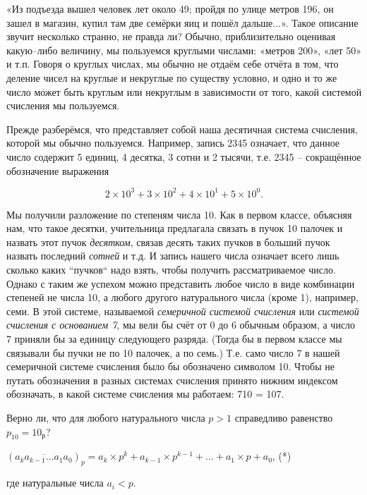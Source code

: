 
«Из подъезда вышел человек лет около 49; пройдя по улице метров 196, он зашел в магазин, купил там две семёрки яиц и пошёл дальше...». Такое описание звучит несколько странно, не правда ли? Обычно, приблизительно оценивая какую--либо величину, мы пользуемся круглыми числами: «метров 200», «лет 50» и т.п. Говоря о круглых числах, мы обычно не отдаём себе отчёта в том, что деление чисел на круглые и некруглые по существу условно, и одно и то же число может быть круглым или некруглым в зависимости от того, какой системой счисления мы пользуемся.

Прежде разберёмся, что представляет собой наша десятичная система счисления, которой мы обычно пользуемся. Например, запись 2345 означает, что данное число содержит 5 единиц, 4 десятка, 3 сотни и 2 тысячи, т.е. 2345 -- сокращённое обозначение выражения

\begin{equation}
    2 \times 10^3 + 3 \times 10^2 + 4 \times 10^1 + 5 \times 10^0.
\end{equation}

Мы получили разложение по степеням числа 10. Как в первом классе, объясняя нам, что такое десятки, учительница предлагала связать в пучок 10 палочек и назвать этот пучок \textit{десятком}, связав десять таких пучков в больший пучок назвать последний \textit{сотней} и т.д. И запись нашего числа означает всего лишь сколько каких “пучков“ надо взять, чтобы получить рассматриваемое число. Однако с таким же успехом можно представить любое число в виде комбинации степеней не числа 10, а любого другого натурального числа (кроме 1), например, семи. В этой системе, называемой \textit{семеричной системой счисления} или \textit{системой счисления с основанием 7}, мы вели бы счёт от 0 до 6 обычным образом, а число 7 приняли бы за единицу следующего разряда. (Тогда бы в первом классе мы связывали бы пучки не по 10 палочек, а по семь.) Т.е. само число 7 в нашей семеричной системе счисления было бы обозначено символом 10. Чтобы не путать обозначения в разных системах счисления принято нижним индексом обозначать, в какой системе счисления мы работаем: 710 = 107.

\begin{thm}
    Верно ли, что для любого натурального числа $p > 1$ справедливо равенство $p_{10} = 10_р$?
\end{thm}

\begin{dfn} \label{11.6 dfn1}
    $\left( \overline{a_ka_{k-1}...a_1a_0} \right)_p = a_k \times p^k + a_{k - 1} \times p^{k - 1} + ... + a_1 \times p + a_0$, \hfill (*)
    \par где натуральные числа $a_i < p$.   
\end{dfn}

